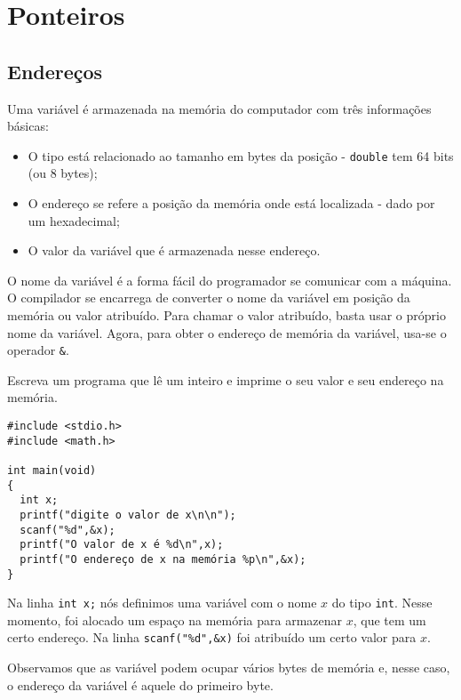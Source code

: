 
\chapter{Ponteiros}
\section{Endereços}
Uma variável é armazenada na memória do computador com três informações básicas: 
\begin{itemize}
 \item O tipo está relacionado ao tamanho em bytes da posição - \verb|double| tem 64 bits (ou 8 bytes);
 \item O endereço se refere a posição da memória onde está localizada - dado por um hexadecimal;
 \item O valor da variável que é armazenada nesse endereço.
\end{itemize}
O nome da variável é a forma fácil do programador se comunicar com a máquina. O compilador se encarrega de converter o nome da variável em posição da memória ou valor atribuído. Para chamar o valor atribuído, basta usar o próprio nome da variável. Agora, para obter o endereço de memória da variável, usa-se o operador \verb|&|.
\begin{ex}
Escreva um programa que lê um inteiro e imprime o seu valor e seu endereço na memória.
\end{ex}
\begin{verbatim}
#include <stdio.h>
#include <math.h>

int main(void)
{
  int x;
  printf("digite o valor de x\n\n");
  scanf("%d",&x);
  printf("O valor de x é %d\n",x);
  printf("O endereço de x na memória %p\n",&x);
}
\end{verbatim}
Na linha \verb|int x;| nós definimos uma variável com o nome $x$ do tipo \verb|int|. Nesse momento, foi alocado um espaço na memória para armazenar $x$, que tem um certo endereço. Na linha \verb|scanf("%d",&x)| foi atribuído um certo valor para $x$. 

Observamos que as variável podem ocupar vários bytes de memória e, nesse caso, o endereço da variável é aquele do primeiro byte.
